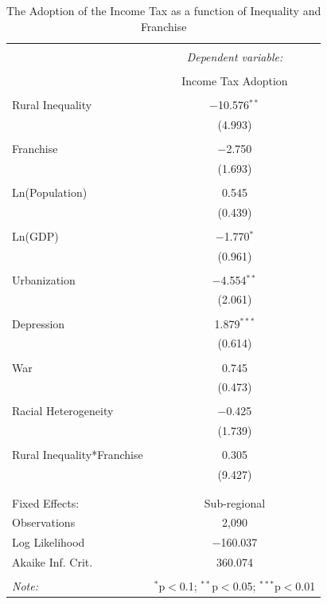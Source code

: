 \documentclass[letter, 12pt]{article}
\begin{document}
\begin{table}[!htbp] \centering 
	\caption{The Adoption of the Income Tax as a function of Inequality and Franchise} 
	\label{} 
	\begin{tabular}{@{\extracolsep{5pt}}lc} 
		\\[-1.8ex]\hline 
		\hline \\[-1.8ex] 
		& \multicolumn{1}{c}{\textit{Dependent variable:}} \\ 
		\cline{2-2} 
		\\[-1.8ex] & Income Tax Adoption \\ 
		\hline \\[-1.8ex] 
		Rural Inequality & $-$10.576$^{**}$ \\ 
		& (4.993) \\ 
		& \\ 
		Franchise & $-$2.750 \\ 
		& (1.693) \\ 
		& \\ 
		Ln(Population) & 0.545 \\ 
		& (0.439) \\ 
		& \\ 
		Ln(GDP) & $-$1.770$^{*}$ \\ 
		& (0.961) \\ 
		& \\ 
		Urbanization & $-$4.554$^{**}$ \\ 
		& (2.061) \\ 
		& \\ 
		Depression & 1.879$^{***}$ \\ 
		& (0.614) \\ 
		& \\ 
		War & 0.745 \\ 
		& (0.473) \\ 
		& \\ 
		Racial Heterogeneity & $-$0.425 \\ 
		& (1.739) \\ 
		& \\ 
		Rural Inequality*Franchise & 0.305 \\ 
		& (9.427) \\ 
		& \\ 
		\hline \\[-1.8ex] 
		Fixed Effects: & Sub-regional \\ 
		Observations & 2,090 \\ 
		Log Likelihood & $-$160.037 \\ 
		Akaike Inf. Crit. & 360.074 \\ 
		\hline 
		\hline \\[-1.8ex] 
		\textit{Note:}  & \multicolumn{1}{r}{$^{*}$p$<$0.1; $^{**}$p$<$0.05; $^{***}$p$<$0.01} \\ 
	\end{tabular} 
\end{table}
\end{document}
